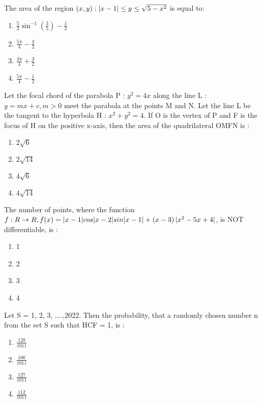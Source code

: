 \iffalse
\title{2022}
\author{AI24BTECH11013}
\section{mcq-single}
\fi

    \item The area of the region ${\left(x, y\right) : |x-1| \leq y \leq \sqrt{5-x^2}}$ is equal to:
\hfill{}
\begin{enumerate}
    \item $\frac{5}{2}\sin^{-1}(\frac{3}{5})-\frac{1}{2}$
    \item $\frac{5\pi}{4}-\frac{3}{2}$
    \item $\frac{3\pi}{4}+\frac{3}{2}$
    \item $\frac{5\pi}{4}-\frac{1}{2}$
\end{enumerate}
\item Let the focal chord of the parabola P : $y^2 = 4x$ along the line L : $y = mx + c, m>0$ meet the parabola at the points M and N. Let the line L be the tangent to the hyperbola H : $x^2 + y^2 = 4$. If O is the vertex of P and F is the focus of H on the positive x-axis, then the area of the quadrilateral OMFN is :
\hfill{}
\begin{enumerate}
    \item $2\sqrt{6}$
    \item $2\sqrt{14}$
    \item $4\sqrt{6}$
    \item $4\sqrt{14}$
\end{enumerate}
\item The number of points, where the function $f : R \rightarrow R, f(x) = |x - 1| cos|x-2| sin|x -1| + \left(x-3\right)|x^2 - 5x + 4|$, is NOT differentiable, is  :
\hfill{}
\begin{enumerate}
    \item 1
    \item 2
    \item 3
    \item 4
\end{enumerate}
\item Let S = {1, 2, 3, ....,2022}. Then the probability, that a randomly chosen number n from the set S such that HCF = 1, is :
\hfill{}
\begin{enumerate}
    \item $\frac{128}{1011}$
    \item $\frac{166}{1011}$
    \item $\frac{127}{1011}$
    \item $\frac{112}{1011}$
\end{enumerate}
